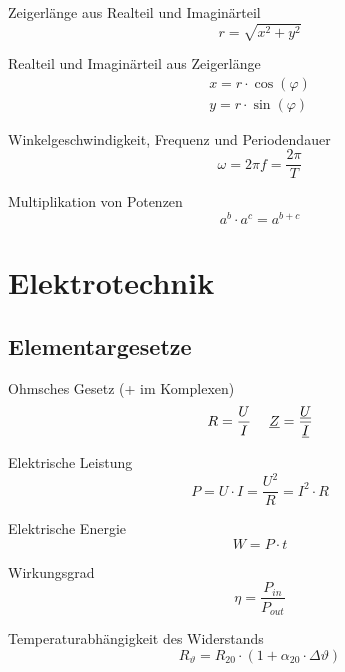 \documentclass[11pt, a4paper, final, fleqn, twocolumn]{article}
\numberwithin{equation}{subsection}
\begin{document}
\noindent Zeigerlänge aus Realteil und Imaginärteil
\begin{equation}
    r = \sqrt{x^2 + y^2}
\end{equation}

\noindent Realteil und Imaginärteil aus Zeigerlänge
\begin{equation}
\begin{split}
    x = r \cdot \cos(\varphi) \\
    y = r \cdot \sin(\varphi)
\end{split}
\end{equation}

\noindent Winkelgeschwindigkeit, Frequenz und Periodendauer
\begin{equation}
    \omega = 2\pi f = \frac{2\pi}{T}
\end{equation}

\noindent Multiplikation von Potenzen
\begin{equation}
    a^b \cdot a^c = a^{b+c}
\end{equation}



\section{Elektrotechnik}

\subsection{Elementargesetze}

Ohmsches Gesetz (+ im Komplexen)
\begin{equation}
    R = \frac{U}{I} \hspace{3ex}
    \underline{Z} = \frac{\underline{U}}{\underline{I}}
\end{equation}

\noindent Elektrische Leistung
\begin{equation}
    P = U \cdot I = \frac{U^2}{R} = I^2 \cdot R
\end{equation}

\noindent Elektrische Energie
\begin{equation}
    W = P \cdot t
\end{equation}

\noindent Wirkungsgrad
\begin{equation}
    \eta = \frac{P_{in}}{P_{out}}
\end{equation}

\noindent Temperaturabhängigkeit des Widerstands
\begin{equation}
    R_\vartheta = R_{20}\cdot(1 + \alpha_{20} \cdot \Delta \vartheta)
\end{equation}
\end{document}
